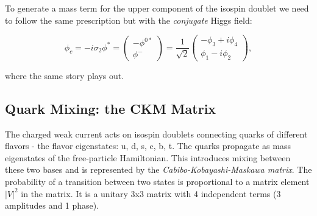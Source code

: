 To generate a mass term for the upper component of the isospin doublet we need to follow the same prescription but with the \textit{conjugate} Higgs field:

\begin{equation}
\phi_{c} = - i \sigma_{2} \phi^{*}
= \begin{pmatrix} -\phi^{0*} \\ \phi^{-} \end{pmatrix} = \frac{1}{\sqrt{2}} \begin{pmatrix} -\phi_{3} + i\phi_{4} \\  \phi_{1} - i \phi_{2} \end{pmatrix},
\end{equation}

where the same story plays out.


\subsection{Quark Mixing: the CKM Matrix}

The charged weak current acts on isospin doublets connecting quarks of different flavors - the flavor eigenstates: u, d, s, c, b, t. The quarks propagate as mass eigenstates of the free-particle Hamiltonian. This introduces mixing between these two bases and is represented by the \textit{Cabibo-Kobayashi-Maskawa matrix}. The probability of a transition between two states is proportional to a matrix element $|V|^{2}$ in the matrix. It is a unitary 3x3 matrix with 4 independent terms (3 amplitudes and 1 phase).

